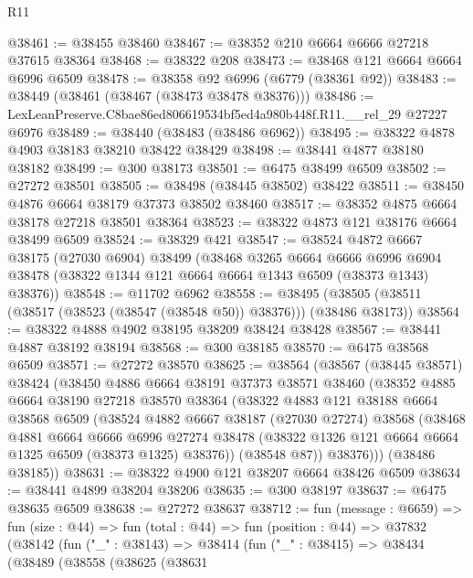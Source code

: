 \begin{lexlean}{R11}
\begin{coremodule}
@38461 := @38455 @38460
@38467 := @38352 @210 @6664 @6666 @27218 @37615 @38364
@38468 := @38322 @208
@38473 := @38468 @121 @6664 @6664 @6996 @6509
@38478 := @38358 @92 @6996 (@6779 (@38361 @92))
@38483 := @38449 (@38461 (@38467 (@38473 @38478 @38376)))
@38486 := LexLeanPreserve.C8bae86ed806619534bf5ed4a980b448f.R11.__rel_29 @27227 @6976
@38489 := @38440 (@38483 (@38486 @6962))
@38495 := @38322 @4878 @4903 @38183 @38210 @38422 @38429
@38498 := @38441 @4877 @38180 @38182
@38499 := @300 @38173
@38501 := @6475 @38499 @6509
@38502 := @27272 @38501
@38505 := @38498 (@38445 @38502) @38422
@38511 := @38450 @4876 @6664 @38179 @37373 @38502 @38460
@38517 := @38352 @4875 @6664 @38178 @27218 @38501 @38364
@38523 := @38322 @4873 @121 @38176 @6664 @38499 @6509
@38524 := @38329 @421
@38547 := @38524
    @4872
    @6667
    @38175
    (@27030 @6904)
    @38499
    (@38468
      @3265
      @6664
      @6666
      @6996
      @6904
      @38478
      (@38322 @1344 @121 @6664 @6664 @1343 @6509 (@38373 @1343) @38376))
@38548 := @11702 @6962
@38558 := @38495 (@38505 (@38511 (@38517 (@38523 (@38547 (@38548 @50)) @38376))) (@38486 @38173))
@38564 := @38322 @4888 @4902 @38195 @38209 @38424 @38428
@38567 := @38441 @4887 @38192 @38194
@38568 := @300 @38185
@38570 := @6475 @38568 @6509
@38571 := @27272 @38570
@38625 := @38564
    (@38567
      (@38445 @38571)
      @38424
      (@38450
        @4886
        @6664
        @38191
        @37373
        @38571
        @38460
        (@38352
          @4885
          @6664
          @38190
          @27218
          @38570
          @38364
          (@38322
            @4883
            @121
            @38188
            @6664
            @38568
            @6509
            (@38524
              @4882
              @6667
              @38187
              (@27030 @27274)
              @38568
              (@38468
                @4881
                @6664
                @6666
                @6996
                @27274
                @38478
                (@38322 @1326 @121 @6664 @6664 @1325 @6509 (@38373 @1325) @38376))
              (@38548 @87))
            @38376)))
      (@38486 @38185))
@38631 := @38322 @4900 @121 @38207 @6664 @38426 @6509
@38634 := @38441 @4899 @38204 @38206
@38635 := @300 @38197
@38637 := @6475 @38635 @6509
@38638 := @27272 @38637
@38712 := fun (message : @6659) =>
  fun (size : @44) =>
  fun (total : @44) =>
  fun (position : @44) =>
  @37832
    (@38142
      (fun ("_" : @38143) =>
      @38414
        (fun ("_" : @38415) =>
        @38434
          (@38489
            (@38558
              (@38625
                (@38631

\end{coremodule}
\end{lexlean}
